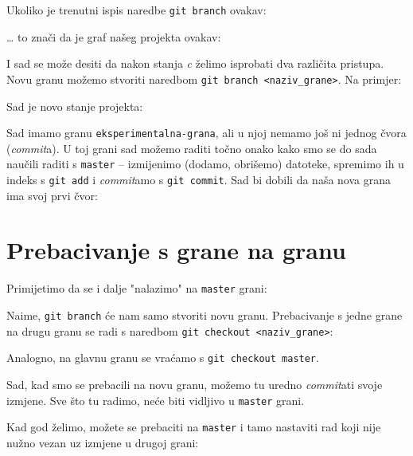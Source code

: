 Ukoliko je trenutni ispis naredbe \verb+git branch+ ovakav:



\dots{} to znači da je graf našeg projekta ovakav:



I sad se može desiti da nakon stanja \emph c želimo isprobati dva različita pristupa.
Novu granu možemo stvoriti naredbom \verb+git branch <naziv_grane>+.
Na primjer:


Sad je novo stanje projekta:



Sad imamo granu \verb+eksperimentalna-grana+, ali u njoj nemamo još ni jednog čvora (\emph{commit}a).
U toj grani sad možemo raditi točno onako kako smo se do sada naučili raditi s \verb+master+ -- izmijenimo (dodamo, obrišemo) datoteke, spremimo ih u indeks s \verb+git add+ i \emph{commit}amo s \verb+git commit+.
Sad bi dobili da naša nova grana ima svoj prvi čvor: 



\section*{Prebacivanje s grane na granu}

Primijetimo da se i dalje "nalazimo" na \verb+master+ grani:



Naime, \verb+git branch+ će nam samo stvoriti novu granu.
Prebacivanje s jedne grane na drugu granu se radi s naredbom \verb+git checkout <naziv_grane>+:



Analogno, na glavnu granu se vraćamo s \verb+git checkout master+.

Sad, kad smo se prebacili na novu granu, možemo tu uredno \emph{commit}ati svoje izmjene. 
Sve što tu radimo, neće biti vidljivo u \verb+master+ grani.



Kad god želimo, možete se prebaciti na \verb+master+ i tamo nastaviti rad koji nije nužno vezan uz izmjene u drugoj grani:



